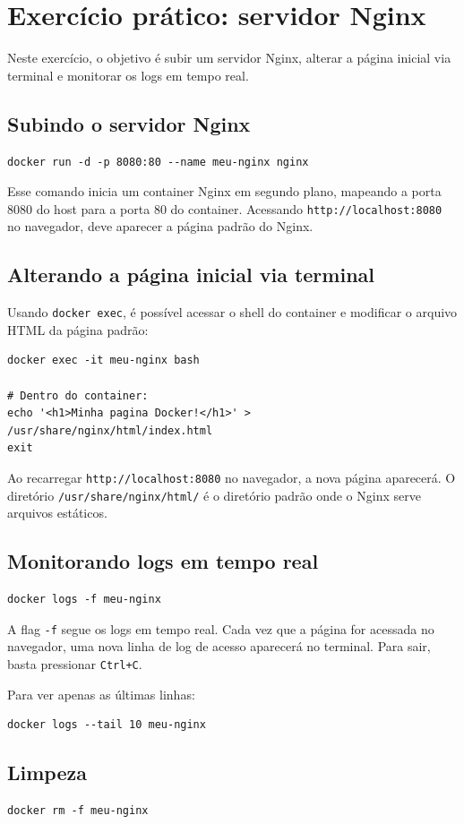 \section{Exercício prático: servidor Nginx}

Neste exercício, o objetivo é subir um servidor Nginx, alterar a página inicial via terminal e monitorar os logs em tempo real.

\subsection{Subindo o servidor Nginx}

\begin{verbatim}
docker run -d -p 8080:80 --name meu-nginx nginx
\end{verbatim}

Esse comando inicia um container Nginx em segundo plano, mapeando a porta 8080 do host para a porta 80 do container. Acessando \texttt{http://localhost:8080} no navegador, deve aparecer a página padrão do Nginx.

\subsection{Alterando a página inicial via terminal}

Usando \texttt{docker exec}, é possível acessar o shell do container e modificar o arquivo HTML da página padrão:

\begin{verbatim}
docker exec -it meu-nginx bash

# Dentro do container:
echo '<h1>Minha pagina Docker!</h1>' > /usr/share/nginx/html/index.html
exit
\end{verbatim}

Ao recarregar \texttt{http://localhost:8080} no navegador, a nova página aparecerá. O diretório \texttt{/usr/share/nginx/html/} é o diretório padrão onde o Nginx serve arquivos estáticos.

\subsection{Monitorando logs em tempo real}

\begin{verbatim}
docker logs -f meu-nginx
\end{verbatim}

A flag \texttt{-f} segue os logs em tempo real. Cada vez que a página for acessada no navegador, uma nova linha de log de acesso aparecerá no terminal. Para sair, basta pressionar \texttt{Ctrl+C}.

Para ver apenas as últimas linhas:

\begin{verbatim}
docker logs --tail 10 meu-nginx
\end{verbatim}

\subsection{Limpeza}

\begin{verbatim}
docker rm -f meu-nginx
\end{verbatim}
